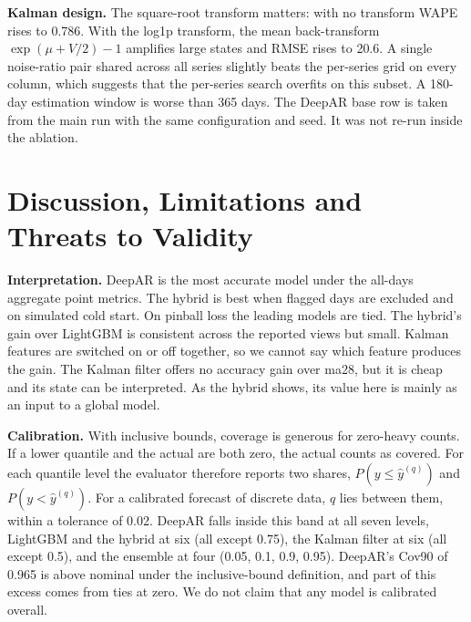 \documentclass[conference]{IEEEtran}
\begin{document}
\textbf{Kalman design.} The square-root transform matters: with no transform WAPE rises to 0.786. With the log1p transform, the mean back-transform $\exp(\mu+V/2)-1$ amplifies large states and RMSE rises to 20.6. A single noise-ratio pair shared across all series slightly beats the per-series grid on every column, which suggests that the per-series search overfits on this subset. A 180-day estimation window is worse than 365 days. The DeepAR base row is taken from the main run with the same configuration and seed. It was not re-run inside the ablation.

\section{Discussion, Limitations and Threats to Validity}
\textbf{Interpretation.} DeepAR is the most accurate model under the all-days aggregate point metrics. The hybrid is best when flagged days are excluded and on simulated cold start. On pinball loss the leading models are tied. The hybrid's gain over LightGBM is consistent across the reported views but small. Kalman features are switched on or off together, so we cannot say which feature produces the gain. The Kalman filter offers no accuracy gain over \textsf{ma28}, but it is cheap and its state can be interpreted. As the hybrid shows, its value here is mainly as an input to a global model.

\textbf{Calibration.} With inclusive bounds, coverage is generous for zero-heavy counts. If a lower quantile and the actual are both zero, the actual counts as covered. For each quantile level the evaluator therefore reports two shares, $P(y\le\hat y^{(q)})$ and $P(y<\hat y^{(q)})$. For a calibrated forecast of discrete data, $q$ lies between them, within a tolerance of 0.02. DeepAR falls inside this band at all seven levels, LightGBM and the hybrid at six (all except 0.75), the Kalman filter at six (all except 0.5), and the ensemble at four (0.05, 0.1, 0.9, 0.95). DeepAR's Cov90 of 0.965 is above nominal under the inclusive-bound definition, and part of this excess comes from ties at zero. We do not claim that any model is calibrated overall.
\end{document}
